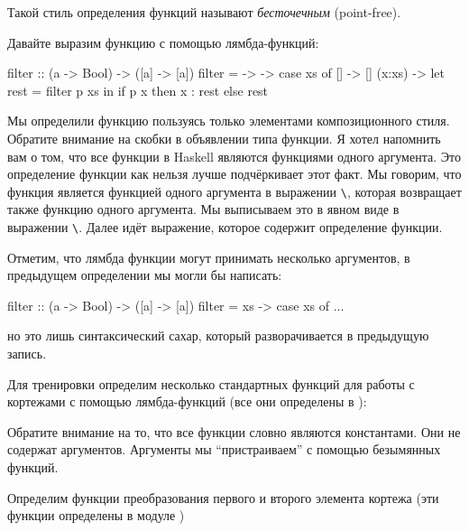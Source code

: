 Такой стиль определения функций называют \emph{бесточечным}
(point-free).

Давайте выразим функцию  с помощью лямбда-функций:


\begin{code}
filter :: (a -> Bool) -> ([a] -> [a])
filter = \p -> \xs -> case xs of
    []     -> []
    (x:xs) -> let rest = filter p xs
              in  if   p x
                  then x : rest
                  else rest
\end{code}

Мы определили функцию  пользуясь только элементами
композиционного стиля. Обратите внимание на скобки в объявлении типа
функции. Я хотел напомнить вам о том, что все функции в Haskell являются
функциями одного аргумента. Это определение функции  как
нельзя лучше подчёркивает этот факт. Мы говорим, что функция 
является функцией одного аргумента  в выражении
\In{}\verb!\!, которая возвращает также функцию одного
аргумента. Мы выписываем это в явном виде в выражении
\In{}\verb!\!. Далее идёт выражение, которое содержит
определение функции.

Отметим, что лямбда функции могут принимать несколько аргументов, в
предыдущем определении мы могли бы написать:


\begin{code}
filter :: (a -> Bool) -> ([a] -> [a])
filter = \p xs -> case xs of
    ...
\end{code}

\noindent 

но это лишь синтаксический сахар, который разворачивается в предыдущую
запись.

Для тренировки определим несколько стандартных функций для работы с
кортежами с помощью лямбда-функций (все они определены в ):



Обратите внимание на то, что все функции словно являются константами.
Они не содержат аргументов. Аргументы мы ``пристраиваем'' с помощью
безымянных функций.

Определим функции преобразования первого и второго элемента кортежа (эти
функции определены в модуле )



